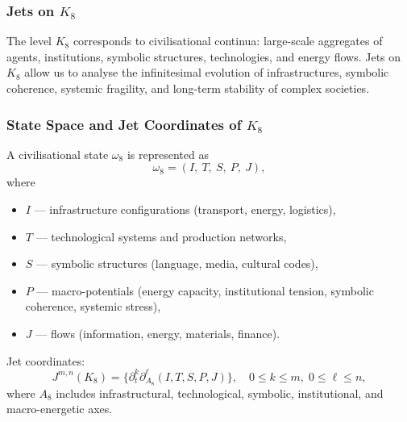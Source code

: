 
\subsubsection{Jets on \texorpdfstring{$K_8$}{K_8}}
\label{sec:jets-k8}

The level $K_8$ corresponds to civilisational continua: large-scale
aggregates of agents, institutions, symbolic structures, technologies,
and energy flows. Jets on $K_8$ allow us to analyse the infinitesimal
evolution of infrastructures, symbolic coherence, systemic fragility,
and long-term stability of complex societies.


\subsubsection{State Space and Jet Coordinates of \texorpdfstring{$K_8$}{K_8}}

A civilisational state $\omega_8$ is represented as
\[
\omega_8 = 
(I,\ T,\ S,\ P,\ J),
\]
where
\begin{itemize}
    \item $I$ — infrastructure configurations (transport, energy, logistics),
    \item $T$ — technological systems and production networks,
    \item $S$ — symbolic structures (language, media, cultural codes),
    \item $P$ — macro-potentials (energy capacity, institutional tension,
                symbolic coherence, systemic stress),
    \item $J$ — flows (information, energy, materials, finance).
\end{itemize}

Jet coordinates:
\[
J^{m,n}(K_8)=
\{\partial_t^k \partial_{A_8}^\ell (I,T,S,P,J)\},
\quad
0\le k\le m,\;0\le\ell\le n,
\]
where $A_8$ includes infrastructural, technological, symbolic,
institutional, and macro-energetic axes.



